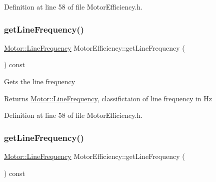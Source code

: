 Definition at line 58 of file Motor\+Efficiency.\+h.

\mbox{\label{class_motor_efficiency_a3cc0ed606154a04d035399e05d1cb02a}} 
\subsubsection{\texorpdfstring{get\+Line\+Frequency()}{getLineFrequency()}\hspace{0.1cm}{\footnotesize\ttfamily [2/3]}}
{\footnotesize\ttfamily \hyperlink{class_motor_acee1bdf1b684ad36cb80dc2829d9fcee}{Motor\+::\+Line\+Frequency} Motor\+Efficiency\+::get\+Line\+Frequency (\begin{DoxyParamCaption}{ }\end{DoxyParamCaption}) const\hspace{0.3cm}{\ttfamily [inline]}}

Gets the line frequency

\begin{DoxyReturn}{Returns}
\hyperlink{class_motor_acee1bdf1b684ad36cb80dc2829d9fcee}{Motor\+::\+Line\+Frequency}, classifictaion of line frequency in Hz 
\end{DoxyReturn}


Definition at line 58 of file Motor\+Efficiency.\+h.

\mbox{\label{class_motor_efficiency_a3cc0ed606154a04d035399e05d1cb02a}} 
\subsubsection{\texorpdfstring{get\+Line\+Frequency()}{getLineFrequency()}\hspace{0.1cm}{\footnotesize\ttfamily [3/3]}}
{\footnotesize\ttfamily \hyperlink{class_motor_acee1bdf1b684ad36cb80dc2829d9fcee}{Motor\+::\+Line\+Frequency} Motor\+Efficiency\+::get\+Line\+Frequency (\begin{DoxyParamCaption}{ }\end{DoxyParamCaption}) const\hspace{0.3cm}{\ttfamily [inline]}}

